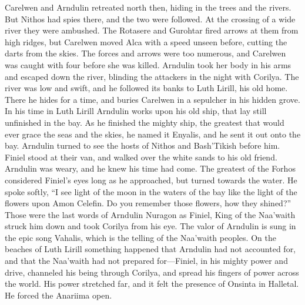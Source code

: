 \documentclass[smalldemyvopaper,11pt,twoside,onecolumn,openright,extrafontsizes]{memoir}
\begin{document}
{{	Carelwen and Arndulin retreated north then, hiding in the trees and the rivers. But Nithos had spies there, and the two were followed. At the crossing of a wide river they were ambushed. The Rotasere and Gurohtar fired arrows at them from high ridges, but Carelwen moved Alca with a speed unseen before, cutting the darts from the skies. The forces and arrows were too numerous, and Carelwen was caught with four before she was killed. Arndulin took her body in his arms and escaped down the river, blinding the attackers in the night with Corilya. The river was low and swift, and he followed its banks to Luth Lirill, his old home. There he hides for a time, and buries Carelwen in a sepulcher in his hidden grove. In his time in Luth Lirill Arndulin works upon his old ship, that lay still unfinished in the bay. As he finished the mighty ship, the greatest that would ever grace the seas and the skies, he named it Enyalis, and he sent it out onto the bay. Arndulin turned to see the hosts of Nithos and Bash’Tikish before him. Finiel stood at their van, and walked over the white sands to his old friend. Arndulin was weary, and he knew his time had come. The greatest of the Forhos considered Finiel’s eyes long as he approached, but turned towards the water. He spoke softly, “I see light of the moon in the waters of the bay like the light of the flowers upon Amon Celefin. Do you remember those flowers, how they shined?” Those were the last words of Arndulin Nuragon as Finiel, King of the Naa’waith struck him down and took Corilya from his eye. The valor of Arndulin is sung in the epic song Vahalis, which is the telling of the Naa’waith peoples.
	On the beaches of Luth Lirill something happened that Arndulin had not accounted for, and that the Naa’waith had not prepared for—Finiel, in his mighty power and drive, channeled his being through Corilya, and spread his fingers of power across the world. His power stretched far, and it felt the presence of Onsinta in Halletal. He forced the Anariima open.
	

}}
\end{document}
